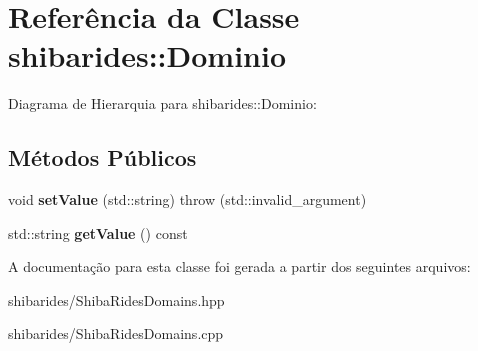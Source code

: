 \hypertarget{classshibarides_1_1Dominio}{}\section{Referência da Classe shibarides\+:\+:Dominio}
\label{classshibarides_1_1Dominio}


Diagrama de Hierarquia para shibarides\+:\+:Dominio\+:
\subsection*{Métodos Públicos}
\begin{DoxyCompactItemize}
\item 
void {\bfseries set\+Value} (std\+::string)  throw (std\+::invalid\+\_\+argument)\hypertarget{classshibarides_1_1Dominio_a459a792e3f90b5b83880d3277c15747c}{}\label{classshibarides_1_1Dominio_a459a792e3f90b5b83880d3277c15747c}

\item 
std\+::string {\bfseries get\+Value} () const \hypertarget{classshibarides_1_1Dominio_aa6fca113add7ee85dee788f4325fe564}{}\label{classshibarides_1_1Dominio_aa6fca113add7ee85dee788f4325fe564}

\end{DoxyCompactItemize}


A documentação para esta classe foi gerada a partir dos seguintes arquivos\+:\begin{DoxyCompactItemize}
\item 
shibarides/Shiba\+Rides\+Domains.\+hpp\item 
shibarides/Shiba\+Rides\+Domains.\+cpp\end{DoxyCompactItemize}
